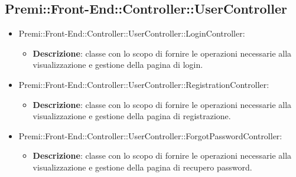 \subsection{Premi::Front-End::Controller::UserController}
	\begin{itemize}
		\item  Premi::Front-End::Controller::UserController::LoginController: 
			 \begin{itemize}
				\item \textbf{Descrizione}: classe con lo scopo di fornire le operazioni necessarie alla visualizzazione e gestione della pagina di login.
			\end{itemize}
		 \item Premi::Front-End::Controller::UserController::RegistrationController:
			\begin{itemize}
				\item \textbf{Descrizione}: classe con lo scopo di fornire le operazioni necessarie alla visualizzazione e gestione della pagina di registrazione.
			\end{itemize}
		\item  Premi::Front-End::Controller::UserController::ForgotPasswordController: 
			 \begin{itemize}
				\item \textbf{Descrizione}: classe con lo scopo di fornire le operazioni necessarie alla visualizzazione e gestione della pagina di recupero password.
			\end{itemize}
	\end{itemize}
